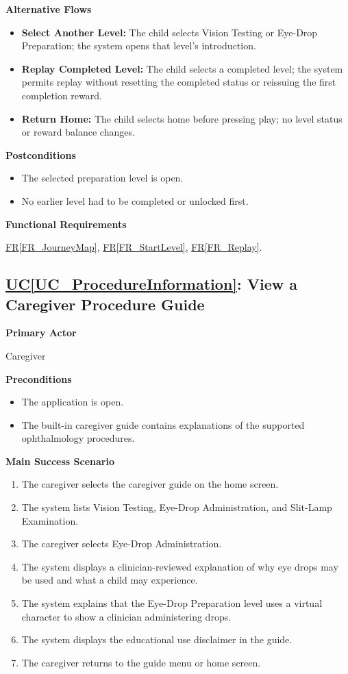 \documentclass[12pt]{article}
\newcounter{ucnum} %
\newcommand{\ucref}[1]{\hyperref[#1]{UC\ref*{#1}}}
\newcommand{\rref}[1]{\hyperref[#1]{FR\ref*{#1}}}
\begin{document}
\textbf{Alternative Flows}
\begin{itemize}
    \item \textbf{Select Another Level:} The child selects Vision Testing
    or Eye-Drop Preparation; the system opens that level's introduction.
    \item \textbf{Replay Completed Level:} The child selects a completed
    level; the system permits replay without resetting the completed
    status or reissuing the first completion reward.
    \item \textbf{Return Home:} The child selects home before pressing
    play; no level status or reward balance changes.
\end{itemize}

\textbf{Postconditions}
\begin{itemize}
    \item The selected preparation level is open.
    \item No earlier level had to be completed or unlocked first.
\end{itemize}

\textbf{Functional Requirements}

\rref{FR_JourneyMap}, \rref{FR_StartLevel}, \rref{FR_Replay}.

\label{UC_ProcedureInformation}
\subsection{\ucref{UC_ProcedureInformation}: View a Caregiver Procedure Guide}

\textbf{Primary Actor}

Caregiver

\textbf{Preconditions}
\begin{itemize}
    \item The application is open.
    \item The built-in caregiver guide contains explanations of the
    supported ophthalmology procedures.
\end{itemize}

\textbf{Main Success Scenario}
\begin{enumerate}
    \item The caregiver selects the caregiver guide on the home screen.
    \item The system lists Vision Testing, Eye-Drop Administration,
    and Slit-Lamp Examination.
    \item The caregiver selects Eye-Drop Administration.
    \item The system displays a clinician-reviewed explanation of why
    eye drops may be used and what a child may experience.
    \item The system explains that the Eye-Drop Preparation level uses
    a virtual character to show a clinician administering drops.
    \item The system displays the educational use disclaimer in the guide.
    \item The caregiver returns to the guide menu or home screen.
\end{enumerate}
\end{document}

